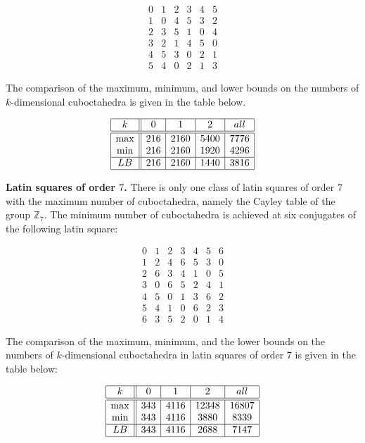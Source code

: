 \documentclass[a4paper]{article}
\begin{document}
$$
\begin{array}{cccccc}
0 & 1 & 2 & 3 & 4 & 5 \\
1 & 0 & 4 & 5 & 3 & 2 \\
2 & 3 & 5 & 1 & 0 & 4 \\
3 & 2 & 1 & 4 & 5 & 0 \\
4 & 5 & 3 & 0 & 2 & 1 \\
5 & 4 & 0 & 2 & 1 & 3
\end{array}
$$

The comparison of the  maximum, minimum, and lower bounds on the numbers of $k$-di\-men\-si\-onal cuboctahedra is given in the table below.

$$
\begin{array}{|c||c|c|c|c|}
\hline
k & 0 & 1 & 2 & all \\
\hline
\hline
\max & 216 & 2160 & 5400 & 7776 \\
\min  & 216 & 2160 & 1920 & 4296 \\
\hline
LB & 216 & 2160 & 1440 & 3816 \\
\hline
\end{array}
$$


 \textbf{Latin squares of order $7$.}
There is only one class of latin squares of order $7$ with the maximum number of cuboctahedra, namely the Cayley table of the group $\mathbb{Z}_7$. The minimum number of cuboctahedra is achieved at  six conjugates of  the following latin square: 


$$
\begin{array}{ccccccc}
0 & 1 & 2 & 3 & 4 & 5 & 6 \\
1 & 2 & 4 & 6 & 5 & 3 & 0 \\
2 & 6 & 3 & 4 & 1 & 0 & 5 \\
3 & 0 & 6 & 5 & 2 & 4 & 1 \\
4 & 5 & 0 & 1 & 3 & 6 & 2 \\
5 & 4 & 1 & 0 & 6 & 2 & 3 \\
6 & 3 & 5 & 2 & 0 & 1 & 4
\end{array}
$$

The comparison of the  maximum, minimum, and the lower bounds on the  numbers of $k$-dimensional cuboctahedra in latin squares of order $7$ is given in the table below:

$$
\begin{array}{|c||c|c|c|c|}
\hline
k & 0 & 1 & 2 & all \\
\hline
\hline
\max & 343 & 4116 & 12348 & 16807 \\
\min  & 343 & 4116 & 3880 & 8339 \\
\hline
LB & 343 & 4116 & 2688 &  7147 \\
\hline
\end{array}
$$
\end{document}
